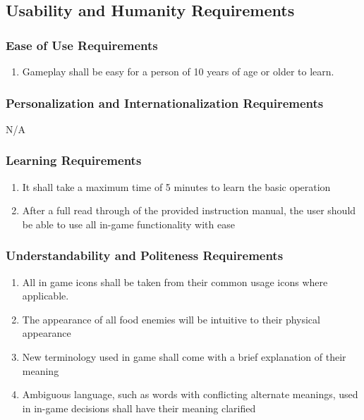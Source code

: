 \documentclass[12pt, titlepage]{article}
\begin{document}

\subsection{Usability and Humanity Requirements}
\label{sub:usability_and_humanity_requirements}

\subsubsection{Ease of Use Requirements}
\label{ssub:ease_of_use_requirements}
\begin{enumerate}[start=1,label={ UH\arabic*.}]
        \item Gameplay shall be easy for a person of 10 years of age or older to learn.
\end{enumerate}

\subsubsection{Personalization and Internationalization Requirements}
\label{ssub:personalization_and_internationalization_requirements}
N/A

\subsubsection{Learning Requirements}
\label{ssub:learning_requirements}
\begin{enumerate}[start=2,label={ UH\arabic*.}]
        \item It shall take a maximum time of 5 minutes to learn the basic operation
        \item After a full read through of the provided instruction manual, the user should be able to use all in-game functionality with ease
\end{enumerate}

\subsubsection{Understandability and Politeness Requirements}
\label{ssub:understandability_and_politeness_requirements}
\begin{enumerate}[start=4,label={ UH\arabic*.}]
        \item All in game icons shall be taken from their common usage icons where applicable.
        \item The appearance of all food enemies will be intuitive to their physical appearance
        \item New terminology used in game shall come with a brief explanation of their meaning
        \item Ambiguous language, such as words with conflicting alternate meanings, used in in-game decisions shall have their meaning clarified

\end{enumerate}
\end{document}
